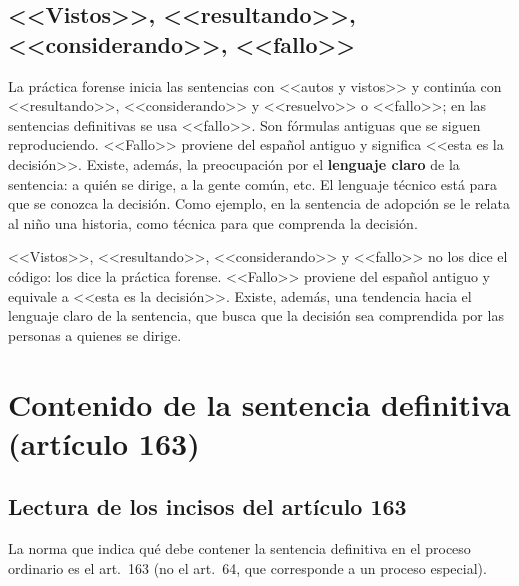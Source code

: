 \documentclass[12pt,oneside]{book}
\begin{document}
\subsection{<<Vistos>>, <<resultando>>, <<considerando>>, <<fallo>>}

La pr\'actica forense inicia las sentencias con <<autos y vistos>> y contin\'ua con <<resultando>>, <<considerando>> y <<resuelvo>> o <<fallo>>; en las sentencias definitivas se usa <<fallo>>. Son f\'ormulas antiguas que se siguen reproduciendo. <<Fallo>> proviene del espa\~nol antiguo y significa <<esta es la decisi\'on>>. Existe, adem\'as, la preocupaci\'on por el \textbf{lenguaje claro} de la sentencia: a qui\'en se dirige, a la gente com\'un, etc. El lenguaje t\'ecnico est\'a para que se conozca la decisi\'on. Como ejemplo, en la sentencia de adopci\'on se le relata al ni\~no una historia, como t\'ecnica para que comprenda la decisi\'on.

\begin{important}
<<Vistos>>, <<resultando>>, <<considerando>> y <<fallo>> no los dice el c\'odigo: los dice la pr\'actica forense. <<Fallo>> proviene del espa\~nol antiguo y equivale a <<esta es la decisi\'on>>. Existe, adem\'as, una tendencia hacia el lenguaje claro de la sentencia, que busca que la decisi\'on sea comprendida por las personas a quienes se dirige.
\end{important}

\section{Contenido de la sentencia definitiva (art\'iculo 163)}

\subsection{Lectura de los incisos del art\'iculo 163}

La norma que indica qu\'e debe contener la sentencia definitiva en el proceso ordinario es el art.~163 (no el art.~64, que corresponde a un proceso especial).
\end{document}
